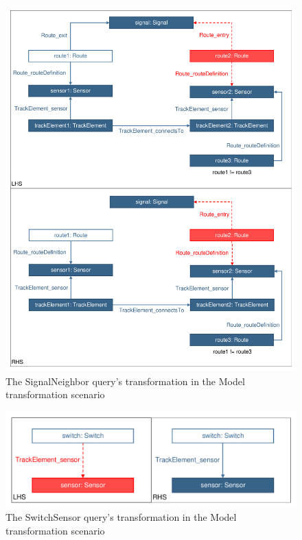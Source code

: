 \begin{figure}[h]
	\centering
	\includegraphics[scale=0.4]{figures/trainbenchmark-transformation-xform-signalneighbor}
	\caption{The SignalNeighbor query's transformation in the Model transformation scenario}
	\label{fig:trainbenchmark-transformation-xform-signalneighbor}
\end{figure}

\begin{figure}[h]
	\centering
	\includegraphics[scale=0.4]{figures/trainbenchmark-transformation-xform-switchsensor}
	\caption{The SwitchSensor query's transformation in the Model transformation scenario}
	\label{fig:trainbenchmark-transformation-xform-switchsensor}
\end{figure}

